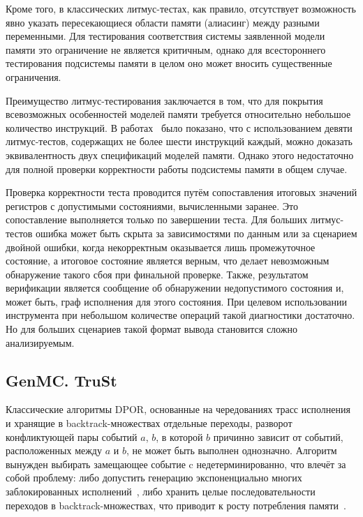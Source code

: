 Кроме того, в классических литмус-тестах, как правило, отсутствует
возможность явно указать пересекающиеся области памяти (алиасинг)
между разными переменными. Для тестирования соответствия системы
заявленной модели памяти это ограничение не является критичным,
однако для всестороннего тестирования подсистемы памяти в целом оно
может вносить существенные ограничения.

Преимущество литмус-тестирования заключается в том, что для покрытия
всевозможных особенностей моделей памяти требуется относительно
небольшое количество инструкций. В работах~\cite{shortestlitmus,
shortestlitmus2} было показано, что с использованием девяти
литмус-тестов, содержащих не более шести инструкций каждый, можно
доказать эквивалентность двух спецификаций моделей памяти. Однако
этого недостаточно для полной проверки корректности работы подсистемы
памяти в общем случае.

Проверка корректности теста проводится путём сопоставления итоговых
значений регистров с допустимыми состояниями, вычисленными заранее.
Это сопоставление выполняется только по завершении теста. Для больших
литмус-тестов ошибка может быть скрыта за зависимостями по данным или
за сценарием двойной ошибки, когда некорректным оказывается лишь
промежуточное состояние, а итоговое состояние является верным, что
делает невозможным обнаружение такого сбоя при финальной проверке.
Также, результатом верификации является сообщение об обнаружении
недопустимого состояния и, может быть, граф исполнения для этого состояния.
При целевом использовании инструмента при небольшом количестве
операций такой диагностики достаточно. Но для больших сценариев такой
формат вывода становится сложно анализируемым.

\subsection{GenMC. TruSt}
\label{sec:genmc}

Классические алгоритмы DPOR, основанные на чередованиях трасс исполнения и
хранящие в backtrack-множествах отдельные переходы, разворот
конфликтующей пары событий $a$, $b$, в которой $b$ причинно зависит
от событий, расположенных между $a$ и $b$, не может быть выполнен
однозначно. Алгоритм вынужден выбирать замещающее событие c
недетерминированно, что влечёт за собой проблему: либо допустить
генерацию экспоненциально многих заблокированных
исполнений~\cite{abdulla2018optimal}, либо хранить целые
последовательности переходов в backtrack-множествах, что приводит к
росту потребления памяти~\cite{abdulla2014optimal}.

